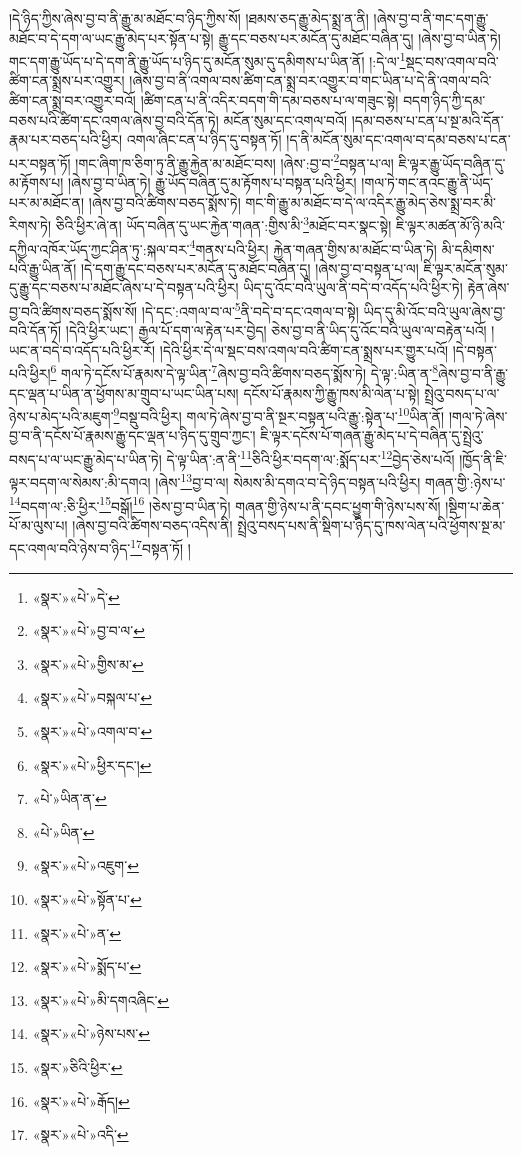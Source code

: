 །དེ་ཉིད་ཀྱིས་ཞེས་བྱ་བ་ནི་རྒྱུ་མ་མཐོང་བ་ཉིད་ཀྱིས་སོ། །ཐམས་ཅད་རྒྱུ་མེད་སྨྲ་ན་ནི། །ཞེས་བྱ་བ་ནི་གང་དག་རྒྱུ་མཐོང་བ་དེ་དག་ལ་ཡང་རྒྱུ་མེད་པར་སྟོན་པ་སྟེ། རྒྱུ་དང་བཅས་པར་མངོན་དུ་མཐོང་བཞིན་དུ། །ཞེས་བྱ་བ་ཡིན་ཏེ། གང་དག་རྒྱུ་ཡོད་པ་དེ་དག་ནི་རྒྱུ་ཡོད་པ་ཉིད་དུ་མངོན་སུམ་དུ་དམིགས་པ་ཡིན་ནོ། །:དེ་ལ་\footnote{«སྣར་»«པེ་»དེ་}སྡང་བས་འགལ་བའི་ཚིག་ངན་སྨྲས་པར་འགྱུར། །ཞེས་བྱ་བ་ནི་འགལ་བས་ཚིག་ངན་སྨྲ་བར་འགྱུར་བ་གང་ཡིན་པ་དེ་ནི་འགལ་བའི་ཚིག་ངན་སྨྲ་བར་འགྱུར་བའོ། །ཚིག་ངན་པ་ནི་འདིར་བདག་གི་དམ་བཅས་པ་ལ་གཟུང་སྟེ། བདག་ཉིད་ཀྱི་དམ་བཅས་པའི་ཚིག་དང་འགལ་ཞེས་བྱ་བའི་དོན་ཏེ། མངོན་སུམ་དང་འགལ་བའོ། །དམ་བཅས་པ་ངན་པ་སྔ་མའི་དོན་རྣམ་པར་བཅད་པའི་ཕྱིར། འགལ་ཞིང་ངན་པ་ཉིད་དུ་བསྟན་ཏོ། །ད་ནི་མངོན་སུམ་དང་འགལ་བ་དམ་བཅས་པ་ངན་པར་བསྟན་ཏོ། །གང་ཞིག་ཁ་ཅིག་ཏུ་ནི་རྒྱུ་རྐྱེན་མ་མཐོང་བས། །ཞེས་:བྱ་བ་\footnote{«སྣར་»«པེ་»བྱ་བ་ལ་}བསྟན་པ་ལ། ཇི་ལྟར་རྒྱུ་ཡོད་བཞིན་དུ་མ་རྟོགས་པ། །ཞེས་བྱ་བ་ཡིན་ཏེ། རྒྱུ་ཡོད་བཞིན་དུ་མ་རྟོགས་པ་བསྟན་པའི་ཕྱིར། །གལ་ཏེ་གང་ནའང་རྒྱུ་ནི་ཡོད་པར་མ་མཐོང་ན། །ཞེས་བྱ་བའི་ཚིགས་བཅད་སྨོས་ཏེ། གང་གི་རྒྱུ་མ་མཐོང་བ་དེ་ལ་འདིར་རྒྱུ་མེད་ཅེས་སྨྲ་བར་མི་རིགས་ཏེ། ཅིའི་ཕྱིར་ཞེ་ན། ཡོད་བཞིན་དུ་ཡང་རྐྱེན་གཞན་:གྱིས་མི་\footnote{«སྣར་»«པེ་»གྱིས་མ་}མཐོང་བར་སྣང་སྟེ། ཇི་ལྟར་མཚན་མོ་ཉི་མའི་དཀྱིལ་འཁོར་ཡོད་ཀྱང་ཤིན་ཏུ་:སྐལ་བར་\footnote{«སྣར་»«པེ་»བསྐལ་པ་}གནས་པའི་ཕྱིར། རྐྱེན་གཞན་གྱིས་མ་མཐོང་བ་ཡིན་ཏེ། མི་དམིགས་པའི་རྒྱུ་ཡིན་ནོ། །དེ་དག་རྒྱུ་དང་བཅས་པར་མངོན་དུ་མཐོང་བཞིན་དུ། །ཞེས་བྱ་བ་བསྟན་པ་ལ། ཇི་ལྟར་མངོན་སུམ་དུ་རྒྱུ་དང་བཅས་པ་མཐོང་ཞེས་པ་དེ་བསྟན་པའི་ཕྱིར། ཡིད་དུ་འོང་བའི་ཡུལ་ནི་བདེ་བ་འདོད་པའི་ཕྱིར་ཏེ། རྟེན་ཞེས་བྱ་བའི་ཚིགས་བཅད་སྨོས་སོ། །དེ་དང་:འགལ་བ་ལ་\footnote{«སྣར་»«པེ་»འགལ་བ་}ནི་བདེ་བ་དང་འགལ་བ་སྟེ། ཡིད་དུ་མི་འོང་བའི་ཡུལ་ཞེས་བྱ་བའི་དོན་ཏོ། །དེའི་ཕྱིར་ཡང་། རྒྱལ་པོ་དག་ལ་རྟེན་པར་བྱེད། ཅེས་བྱ་བ་ནི་ཡིད་དུ་འོང་བའི་ཡུལ་ལ་བརྟེན་པའོ། །ཡང་ན་བདེ་བ་འདོད་པའི་ཕྱིར་རོ། །དེའི་ཕྱིར་དེ་ལ་སྡང་བས་འགལ་བའི་ཚིག་ངན་སྨྲས་པར་གྱུར་པའོ། །དེ་བསྟན་པའི་ཕྱིར།\footnote{«སྣར་»«པེ་»ཕྱིར་དང་།} གལ་ཏེ་དངོས་པོ་རྣམས་དེ་ལྟ་ཡིན་\footnote{«པེ་»ཡིན་ན་}ཞེས་བྱ་བའི་ཚིགས་བཅད་སྨོས་ཏེ། དེ་ལྟ་:ཡིན་ན་\footnote{«པེ་»ཡིན་}ཞེས་བྱ་བ་ནི་རྒྱུ་དང་ལྡན་པ་ཡིན་ན་ཕྱོགས་མ་གྲུབ་པ་ཡང་ཡིན་པས། དངོས་པོ་རྣམས་ཀྱི་རྒྱུ་ཁས་མི་ལེན་པ་སྟེ། སྤྲེའུ་བསད་པ་ལ་ཉེས་པ་མེད་པའི་མཇུག་\footnote{«སྣར་»«པེ་»འཇུག་}བསྡུ་བའི་ཕྱིར། གལ་ཏེ་ཞེས་བྱ་བ་ནི་སྔར་བསྟན་པའི་རྒྱུ་:སྟེན་པ་\footnote{«སྣར་»«པེ་»སྟོན་པ་}ཡིན་ནོ། །གལ་ཏེ་ཞེས་བྱ་བ་ནི་དངོས་པོ་རྣམས་རྒྱུ་དང་ལྡན་པ་ཉིད་དུ་གྲུབ་ཀྱང་། ཇི་ལྟར་དངོས་པོ་གཞན་རྒྱུ་མེད་པ་དེ་བཞིན་དུ་སྤྲེའུ་བསད་པ་ལ་ཡང་རྒྱུ་མེད་པ་ཡིན་ཏེ། དེ་ལྟ་ཡིན་:ན་ནི་\footnote{«སྣར་»«པེ་»ན་}ཅིའི་ཕྱིར་བདག་ལ་:སྨོད་པར་\footnote{«སྣར་»«པེ་»སྨོད་པ་}བྱེད་ཅེས་པའོ། །ཁྱོད་ནི་ཇི་ལྟར་བདག་ལ་སེམས་:མི་དགའ། །ཞེས་\footnote{«སྣར་»«པེ་»མི་དགའཞིང་}བྱ་བ་ལ། སེམས་མི་དགའ་བ་དེ་ཉིད་བསྟན་པའི་ཕྱིར། གཞན་གྱི་:ཉེས་པ་\footnote{«སྣར་»«པེ་»ཉེས་པས་}བདག་ལ་:ཅི་ཕྱིར་\footnote{«སྣར་»ཅིའི་ཕྱིར་}བསྒོ།\footnote{«སྣར་»«པེ་»རྒོད།} །ཅེས་བྱ་བ་ཡིན་ཏེ། གཞན་གྱི་ཉེས་པ་ནི་དབང་ཕྱུག་གི་ཉེས་པས་སོ། །སྡིག་པ་ཆེན་པོ་མ་ལུས་པ། །ཞེས་བྱ་བའི་ཚིགས་བཅད་འདིས་ནི། སྤྲེའུ་བསད་པས་ནི་སྡིག་པ་ཉིད་དུ་ཁས་ལེན་པའི་ཕྱོགས་སྔ་མ་དང་འགལ་བའི་ཉེས་བ་ཉིད་\footnote{«སྣར་»«པེ་»འདི་}བསྟན་ཏོ། །
